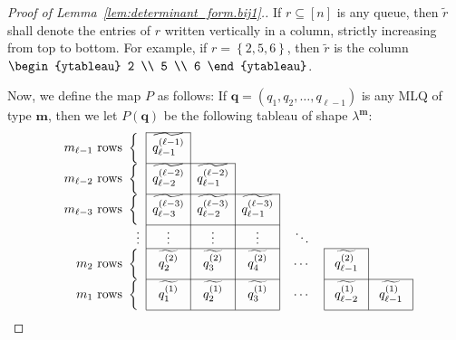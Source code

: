 \documentclass[reqno]{amsart}
\newcommand{\0}{\phantom{c}}
\newcommand{\mm}{\mathbf{m}}
\newcommand{\qq}{\mathbf{q}}
\newcommand{\set}[1]{\left\{ #1 \right\}}
\newcommand{\tup}[1]{\left( #1 \right)}
\newcommand{\ive}[1]{\left[ #1 \right]}
\theoremstyle{plain}
\theoremstyle{definition}
\numberwithin{equation}{section}
\begin{document}
\begin{proof}[Proof of Lemma~\ref{lem:determinant_form.bij1}.]
If $r \subseteq \ive{n}$ is any queue, then $\widetilde{r}$ shall denote the entries of $r$ written vertically in a column, strictly increasing from top to bottom.
For example, if $r = \set{2,5,6}$, then $\widetilde{r}$ is the column $\begin{ytableau} 2 \\ 5 \\ 6 \end{ytableau}$.

Now, we define the map $P$ as follows: If $\qq = \tup{q_1, q_2, \dotsc, q_{\ell-1}}$ is any MLQ of type $\mm$, then we let $P(\qq)$ be the following tableau of shape $\lambda^{\mm}$:
\begin{equation}
\label{pf.lem:determinant_form.bij1.visual}
\begin{array}[c]{r|c|ccc@{\hspace{30pt}}c@{\hspace{35pt}}c@{\hspace{35pt}}}
\cline{2-2}%
m_{\ell-1} \text{ rows } \left\{ \vphantom{\dfrac{2^2}{2^2}}\right.
    & \widetilde{q_{\ell-1}^{(\ell-1)}} &  &  &  &  & \\\cline{2-3}
m_{\ell-2} \text{ rows } \left\{ \vphantom{\dfrac{2^2}{2^2}}\right.
    & \widetilde{q_{\ell-2}^{(\ell-2)}} & \widetilde{q_{\ell-1}^{(\ell-2)}} & \multicolumn{1}{|c}{} &  &  & \\\cline{2-4}
m_{\ell-3} \text{ rows } \left\{  \vphantom{\dfrac{2^2}{2^2}}\right.
    & \widetilde{q_{\ell-3}^{(\ell-3)}} & \widetilde{q_{\ell-2}^{(\ell-3)}} & \multicolumn{1}{|c}{\widetilde{q_{\ell-1}^{(  \ell-3)}}} & \multicolumn{1}{|c}{} &  & \\\cline{2-4}%
\vdots & \mathbf{\vdots} & \mathbf{\vdots} & \multicolumn{1}{|c}{\vdots} & \multicolumn{1}{|c}{\ddots} &  & \\\cline{2-4}\cline{6-6}
m_2 \text{ rows } \left\{  \vphantom{\dfrac{2^2}{2^2}}\right.
    & \widetilde{q_2^{(2)}} & \widetilde{q_{3}^{(2)}} & \multicolumn{1}{|c}{\widetilde{q_{4}^{(2)}}} & \multicolumn{1}{|c}{\cdots} & \multicolumn{1}{|c}{\widetilde{q_{\ell-1}^{(2)}}} & \multicolumn{1}{|c}{}\\\cline{2-4}\cline{6-7}
m_1 \text{ rows } \left\{ \vphantom{\dfrac{2^2}{2^2}}\right.
    & \widetilde{q_1^{(1)}} & \widetilde{q_2^{(1)}} & \multicolumn{1}{|c}{\widetilde{q_{3}^{(1)}}} & \multicolumn{1}{|c}{\cdots} & \multicolumn{1}{|c}{\widetilde{q_{\ell-2}^{(1)}}} & \multicolumn{1}{|c|}{\widetilde{q_{\ell-1}^{(1)}}}\\\cline{2-4}\cline{6-7}

\end{array}
\end{equation}
\end{proof}
\end{document}
